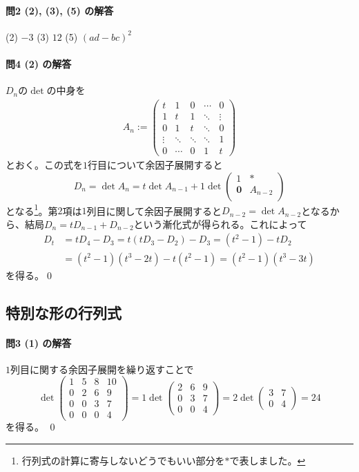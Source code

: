 \paragraph{問2 (2), (3), (5) の解答} (2) $-3$ \quad (3) $12$ \quad (5) $(ad - bc)^2$

\paragraph{問4 (2) の解答} $D_n$の$\det$の中身を
\begin{align*}
A_n := 
\begin{pmatrix}
t & 1 & 0 & \cdots & 0 \\
1 & t & 1 & \ddots & \vdots \\
0 & 1 & t & \ddots & 0 \\
\vdots & \ddots & \ddots & \ddots & 1 \\
0 & \cdots & 0 & 1 & t
\end{pmatrix}
\end{align*}
とおく。この式を$1$行目について余因子展開すると
\[
D_n = \det A_n
= t \det A_{n - 1} + 1 \det
\begin{pmatrix}
1 & * \\
\bm{0} & A_{n - 2} \\
\end{pmatrix}
\]
となる\footnote{行列式の計算に寄与しないどうでもいい部分を$*$で表しました。}。第$2$項は$1$列目に関して余因子展開すると$D_{n - 2} = \det A_{n - 2}$となるから、結局$D_n = t D_{n - 1} + D_{n - 2}$という漸化式が得られる。これによって
\begin{align*}
D_t &=
t D_4 - D_3 = t(t D_3 - D_2) - D_3 = (t^2 - 1) - t D_2 \\
&= (t^2 - 1)(t^3 - 2t) - t(t^2 - 1) = (t^2 - 1)(t^3 - 3t)
\end{align*}
を得る。\qed

\subsection{特別な形の行列式}

\paragraph{問3 (1) の解答} $1$列目に関する余因子展開を繰り返すことで
\[
\det
\begin{pmatrix}
1 & 5 & 8 & 10 \\
0 & 2 & 6 & 9 \\
0 & 0 & 3 & 7 \\
0 & 0 & 0 & 4
\end{pmatrix}
= 1 \det
\begin{pmatrix}
2 & 6 & 9 \\
0 & 3 & 7 \\
0 & 0 & 4
\end{pmatrix}
= 2 \det
\begin{pmatrix}
3 & 7 \\
0 & 4
\end{pmatrix}
= 24
\]
を得る。 \qed

